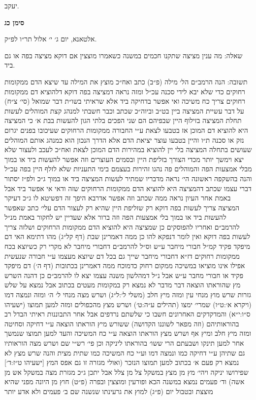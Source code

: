 \documentclass[12pt, openany]{book}
\newcommand{\chapname}{}
\newcommand{\newchap}[1]{
	\addcontentsline{toc}{chapter}{#1}
	\renewcommand{\chapname}{#1}
		\begin{center}
			\textbf{%
\fontsize{16pt}{16pt}\selectfont
				#1}
		\end{center}
}
\begin{document}
\begin{multicols}{2}
יעקב.\\\vspace{0pt}

\end{multicols}\newpage

\newchap{סימן כג}
\begin{multicols}{2}
אלטאנא, יום ג׳ י׳ אלול תר״ו לפ״ק.\\\vspace{0pt}

שאלה: מה ענין מציצה שתקנו חכמים במשנה כשאמרו מוצצין אם דוקא מציצה בפה או גם ביד.\\\vspace{0pt}

תשובה: הנה הרמב״ם הל׳ מילה (פ״ב) כתב ואח״כ מוצץ את המילה עד שיצא הדם ממקומות רחוקים כדי שלא יבא לידי סכנה עכ״ל ומזה נראה דמציצה בפה דוקא דלהוציא דם ממקומות רחוקים צריך כח משיכה ואי אפשר בדחיקה ביד אלא שראיתי בשו״ת דבר שמואל (סי׳ צ״ח) על דבר עשיית המציצה ביין בט״ב וביוה״כ שכתב וכבר חשבתי למנהג קצת המוהלים לעשות תחלת המציצה בזילוף היין שבפיהם הם שני הפכים בלתי הגון להעשות בבת א׳ כי המציצה היא להוציא דם המוכן אז בטבעו לצאת ע״י החבורה ממקומות הרחוקים שעיכובו בפנים יגרום נזק או סכנה ת״ו והיין בטבעו עוצר יציאת הדם אלא הדרך הנכון הוא כמנהג אותם המוהלים שעושים בתחלה המציצה בלי יין להוציא במהירות הדם המוכן לצאת ואח״כ לעכב ולעצור שלא יצא וימשך יותר מכדי הצורך בזליפת היין ובסמים העוצרים וזה אפשר להעשות ביד או במוך מבלי אמצעות הפה והמוהלים פה נהגו זהירות בעצמם בימי התעניות שלא לזלף היין בפה עכ״ל והנה בהשקפה ראשונה הי׳ נראה מדבריו שמתיר לעשות המציצה ביד או במוך ג״כ ולפ״ז יסתור דברי עצמו שכתב דהמציצה היא להוציא הדם ממקומות הרחוקים שזה ודאי אי אפשר ביד אבל באמת אחר העיון נראה ממה שכתב וזה אפשר אדרבא היפך זה דפשיטא לו ג״כ דעיקר המציצה צריך לעשות בפה דוקא רק שזליפת היין שהיא רק לעצור הדם עלי׳ כתב שאפשר להעשות ביד או במוך בלי אמצעות הפה וזה ברור אלא שעדיין יש לחקור באמת מנ״ל להרמב״ם ואחריו להפוסקים כן שמציצה היא להוציא הדם ממקומות הרחוקים ושלזה צריך לעשות בפה דוקא ואין לומר דנפקא להו כן ממה דאמרינן שבת (דף קל״ג) מהו דתימא האי דם מיפקד פקיד קמ״ל חבורי מיחבר ע״ש וס״ל להרמב״ם דחבורי מיחבר לא מקרי רק כשיוצא בכח ממקומות רחוקים דז״א דחבורי מיחבר שייך גם בכל דם שיוצא מעצמו ע״י חבורה שנעשית אפילו אינו מוציאו במשיכה ממקום רחוק כדמוכח ממה דאמרינן בכתובות (דף ה׳) דם מיפקד פקיד או חבורי מחבר ע״ש אבל נ״ל דמהלשון משנה עצמו יצא לו להרמב״ם כן דהנה השרש מץ שהוראתו הוצאה דבר מדבר לא נמצא רק במקומות מעטים בכתוב אבל נמצא על שלש גזרות שרש מוץ מנחי עין ומזה מיץ חלב (משלי ל׳:ל״ג) ושרש מצה מנחי ל׳ ה׳ ומזה ונמצה דמו (ויקרא א׳:ט״ו) שמרי׳ ימצו (תהילים ע״ה:ט׳) ושרש מצץ מהכפולים ומזה למען תמוצו (ישעיהו ס״ו:י״א) והמדקדקים האחרונים חשבו כי שלשתם נרדפים אבל אחר התבוננות ראיתי הבדל רב בהוראותיהם (וזה מפאר לשוננו הקדושה) ששורש מיץ הוראתו הוצאה ע״י דחיקה וסחיטה ומזה מיץ חלב ומיץ אף ושרש מצץ הוראתו הוצאה ע״י כח המשיכה והעד למען תמוצו שנמשך אחר למען תינקו ושבעתם הרי ששו׳ בהוראתו ליניקה וכן פי׳ רש״י שם ושרש מצה הוראותיו גם שתיהן ע״י דחיקה כמו ונמצה דמו וע״י כח המשיכה כמו שתית מצית והנה שרש מצץ לא נמצא רק פעם א׳ בכתוב למען תמוצו הנזכר (ואולי מגזרה זו גם אפס המץ [ישעיהו ט״ז:ד׳] שפירושו יניקה ויהי׳ מץ מן מצץ במשקל צל מן צלל אבל יתכן ג״כ מגזרת מצה במשקל אש מן אשה) וד׳ פעמים נמצא במשנה הכא ופורעין ומוצצין ובפרה (פ״ט) חוץ מן היונה מפני שהיא מוצצת ובטבול יום (פ״ג) למוץ את גרעינתו שנשנה שם ב׳ פעמים ולא אדע יותר 
\end{multicols}
\end{document}
